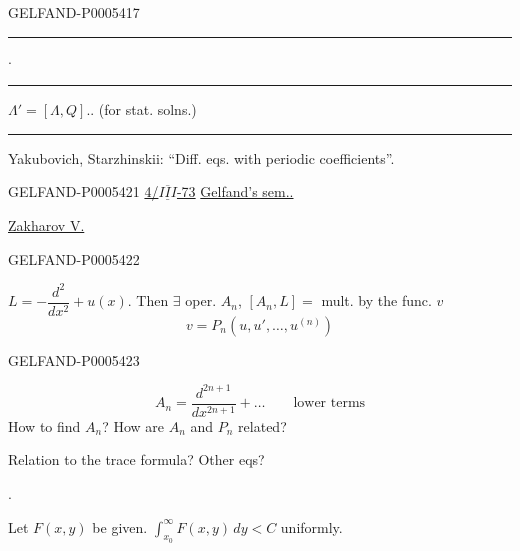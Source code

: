 \begin{GelfandAdjacentEvidence}{GELFAND-P000541}{7}

\hfill\rule{1.35cm}{.35pt}\enspace\(\cdot\)\enspace\rule{1.35cm}{.35pt}\par

\(\Lambda'=[\Lambda,Q]\).\qquad {}. (for stat. solns.)

\noindent\rule{\linewidth}{.35pt}\par
Yakubovich, Starzhinskii: “Diff. eqs. with periodic coefficients”.
\end{GelfandAdjacentEvidence}



\begin{GelfandAdjacentEvidence}{GELFAND-P000542}{1}
\uline{4/\mbox{$\overline{\underline{III}}$}-73}
\qquad\uline{Gelfand’s sem..}

\uline{Zakharov V.}
\end{GelfandAdjacentEvidence}
\begin{GelfandAdjacentEvidence}{GELFAND-P000542}{2}


\quad \(L=-\dfrac{d^2}{dx^2}+u(x)\).
Then \(\exists\) oper. \(A_n\),
\([A_n,L]={}\) mult. by the func. \(v\)
\[
v=P_n(u,u',\ldots,u^{(n)})
\]
\end{GelfandAdjacentEvidence}
\begin{GelfandAdjacentEvidence}{GELFAND-P000542}{3}

\[
A_n=\frac{d^{2n+1}}{dx^{2n+1}}+\ldots
\qquad\text{lower terms}
\]
How to find \(A_n\)? How are \(A_n\) and \(P_n\) related?

Relation to the trace formula? Other eqs?

\quad{}.

Let \(F(x,y)\) be given.
\(\displaystyle\int_{x_0}^\infty F(x,y)\,dy<C\) uniformly.
\end{GelfandAdjacentEvidence}

